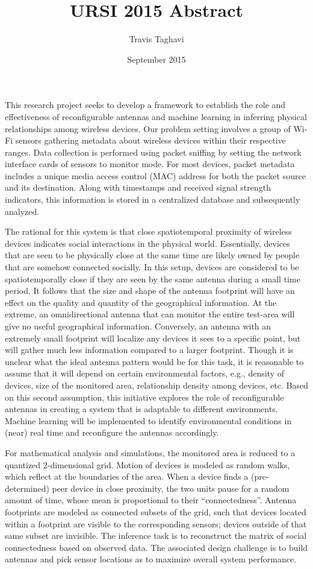 \documentclass{article}
\title{URSI 2015 Abstract}
\author{Travis Taghavi}
\date{September 2015}
\begin{document}
\maketitle

This research project seeks to develop a framework to establish the role and effectiveness of reconfigurable antennas and machine learning in inferring physical relationships among wireless devices.
Our problem setting involves a group of Wi-Fi sensors gathering metadata about wireless devices within their respective ranges.
Data collection is performed using packet sniffing by setting the network interface cards of sensors to monitor mode.
For most devices, packet metadata includes a unique media access control (MAC) address for both the packet source and its destination.
Along with timestamps and received signal strength indicators, this information is stored in a centralized database and subsequently analyzed.

The rational for this system is that close spatiotemporal proximity of wireless devices indicates social interactions in the physical world.
Essentially, devices that are seen to be physically close at the same time are likely owned by people that are somehow connected socially.
In this setup, devices are considered to be spatiotemporally close if they are seen by the same antenna during a small time period.
It follows that the size and shape of the antenna footprint will have an effect on the quality and quantity of the geographical information.
At the extreme, an omnidirectional antenna that can monitor the entire test-area will give no useful geographical information.
Conversely, an antenna with an extremely small footprint will localize any devices it sees to a specific point, but will gather much less information compared to a larger footprint.
Though it is unclear what the ideal antenna pattern would be for this task, it is reasonable to assume that it will depend on certain environmental factors, e.g., density of devices, size of the monitored area, relationship density among devices, etc.
Based on this second assumption, this initiative explores the role of reconfigurable antennas in creating a system that is adaptable to different environments.
Machine learning will be implemented to identify environmental conditions in (near) real time and reconfigure the antennas accordingly.

For mathematical analysis and simulations, the monitored area is reduced to a quantized 2-dimensional grid.
Motion of devices is modeled as random walks, which reflect at the boundaries of the area.
When a device finds a (pre-determined) peer device in close proximity, the two units pause for a random amount of time, whose mean is proportional to their ``connectedness''.
Antenna footprints are modeled as connected subsets of the grid, such that devices located within a footprint are visible to the corresponding sensors; devices outside of that same subset are invisible.
The inference task is to reconstruct the matrix of social connectedness based on observed data.
The associated design challenge is to build antennas and pick sensor locations as to maximize overall system performance.
\end{document}
